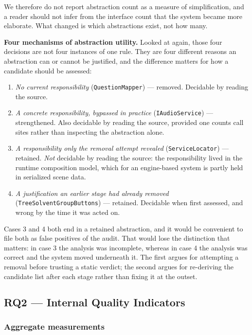 \documentclass{sbc2019}%
\begin{document}
We therefore do not report abstraction count as a measure of simplification, and
a reader should not infer from the interface count that the system became more
elaborate. What changed is which abstractions exist, not how many.

\medskip\noindent\textbf{Four mechanisms of abstraction utility.} Looked at
again, those four decisions are not four instances of one rule. They are four
different reasons an abstraction can or cannot be justified, and the difference
matters for how a candidate should be assessed:

\begin{enumerate}\itemsep2pt
\item \emph{No current responsibility} (\texttt{QuestionMapper}) --- removed.
Decidable by reading the source.
\item \emph{A concrete responsibility, bypassed in practice}
(\texttt{IAudioService}) --- strengthened. Also decidable by reading the source,
provided one counts call sites rather than inspecting the abstraction alone.
\item \emph{A responsibility only the removal attempt revealed}
(\texttt{ServiceLocator}) --- retained. \emph{Not} decidable by reading the
source: the responsibility lived in the runtime composition model, which for an
engine-based system is partly held in serialized scene data.
\item \emph{A justification an earlier stage had already removed}
(\texttt{TreeSolventGroupButtons}) --- retained. Decidable when first assessed,
and wrong by the time it was acted on.
\end{enumerate}

Cases 3 and 4 both end in a retained abstraction, and it would be convenient to
file both as false positives of the audit. That would lose the distinction that
matters: in case 3 the analysis was incomplete, whereas in case 4 the analysis
was correct and the system moved underneath it. The first argues for attempting
a removal before trusting a static verdict; the second argues for re-deriving
the candidate list after each stage rather than fixing it at the outset.

\subsection{RQ2 --- Internal Quality Indicators}\label{sec:rq2}

\subsubsection{Aggregate measurements}
\end{document}
